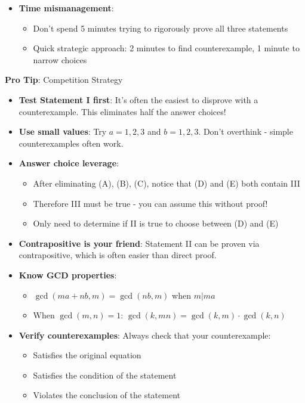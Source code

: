 \documentclass[12pt]{article}
\begin{document}
\begin{warningbox}
\begin{itemize}
    \item \textbf{Time mismanagement}: 
    \begin{itemize}
        \item Don't spend 5 minutes trying to rigorously prove all three statements
        \item Quick strategic approach: 2 minutes to find counterexample, 1 minute to narrow choices
    \end{itemize}
\end{itemize}
\end{warningbox}

\begin{tipbox}
\textbf{Pro Tip}: Competition Strategy

\begin{itemize}
    \item \textbf{Test Statement I first}: It's often the easiest to disprove with a counterexample. This eliminates half the answer choices!
    
    \item \textbf{Use small values}: Try $a=1, 2, 3$ and $b=1, 2, 3$. Don't overthink - simple counterexamples often work.
    
    \item \textbf{Answer choice leverage}: 
    \begin{itemize}
        \item After eliminating (A), (B), (C), notice that (D) and (E) both contain III
        \item Therefore III must be true - you can assume this without proof!
        \item Only need to determine if II is true to choose between (D) and (E)
    \end{itemize}
    
    \item \textbf{Contrapositive is your friend}: Statement II can be proven via contrapositive, which is often easier than direct proof.
    
    \item \textbf{Know GCD properties}: 
    \begin{itemize}
        \item $\gcd(ma+nb, m) = \gcd(nb, m)$ when $m|ma$
        \item When $\gcd(m,n)=1$: $\gcd(k, mn) = \gcd(k,m) \cdot \gcd(k,n)$
    \end{itemize}
    
    \item \textbf{Verify counterexamples}: Always check that your counterexample:
    \begin{itemize}
        \item Satisfies the original equation
        \item Satisfies the condition of the statement
        \item Violates the conclusion of the statement
    \end{itemize}
    

\end{itemize}
\end{tipbox}
\end{document}
